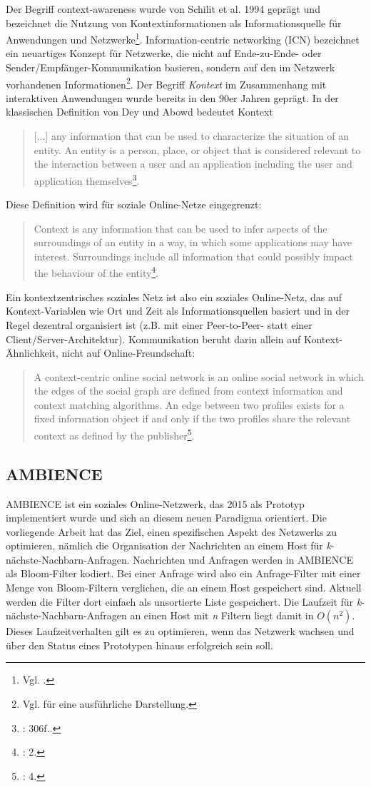 Der Begriff context-awareness wurde von Schilit et al. 1994 geprägt und bezeichnet die Nutzung von Kontextinformationen als Informationsquelle für Anwendungen und Netzwerke\footnote{Vgl. \cite{Schilit1994}.}. Information-centric networking (ICN) bezeichnet ein neuartiges Konzept für Netzwerke, die nicht auf Ende-zu-Ende- oder Sender/Empfänger-Kommunikation basieren, sondern auf den im Netzwerk vorhandenen Informationen\footnote{Vgl. \cite{Ahlgren2012} für eine ausführliche Darstellung.}. 
Der Begriff \textit{Kontext} im Zusammenhang mit interaktiven Anwendungen wurde bereits in den 90er Jahren geprägt. In der klassischen Definition von Dey und Abowd bedeutet Kontext 
\begin{quote}
[...] any information that can be used to characterize the situation of an entity. An entity is a person, place, or object that is considered relevant to the interaction between a user and an application including the user and application themselves\footnote{\cite{Dey1999}: 306f..}. 
\end{quote}
Diese Definition wird für soziale Online-Netze eingegrenzt: 
\begin{quote}
Context is any information that can be used to infer aspects of the surroundings of an entity in a way, in which some applications may have interest. Surroundings include all information that could possibly impact the behaviour of the entity\footnote{\cite{Werner2015}: 2.}.
\end{quote}
Ein kontextzentrisches soziales Netz ist also ein soziales Online-Netz, das auf Kontext-Variablen wie Ort und Zeit als Informationsquellen basiert und in der Regel dezentral organisiert ist (z.B. mit einer Peer-to-Peer- statt einer Client/Server-Architektur). Kommunikation beruht darin allein auf Kontext-Ähnlichkeit, nicht auf Online-Freundschaft: 
\begin{quote}
A context-centric online social network is an online social network in which the edges of the social graph are defined from context information and context matching algorithms. An edge between two profiles exists for a fixed information object if and only if the two profiles share the relevant context as defined by the publisher\footnote{\cite{Werner2015}: 4.}.
\end{quote}
\subsection{AMBIENCE}\label{sec:ambience}
AMBIENCE ist ein soziales Online-Netzwerk, das 2015 als Prototyp implementiert wurde und sich an diesem neuen Paradigma orientiert. Die vorliegende Arbeit hat das Ziel, einen spezifischen Aspekt des Netzwerks zu optimieren, nämlich die Organisation der Nachrichten an einem Host für \textit{k}-nächste-Nachbarn-Anfragen. Nachrichten und Anfragen werden in AMBIENCE als Bloom-Filter kodiert. Bei einer Anfrage wird also ein Anfrage-Filter mit einer Menge von Bloom-Filtern verglichen, die an einem Host gespeichert sind. Aktuell werden die Filter dort einfach als unsortierte Liste gespeichert. Die Laufzeit für \textit{k}-nächste-Nachbarn-Anfragen an einen Host mit \textit{n} Filtern liegt damit in $O(n^2)$. Dieses Laufzeitverhalten gilt es zu optimieren, wenn das Netzwerk wachsen und über den Status eines Prototypen hinaus erfolgreich sein soll. 

